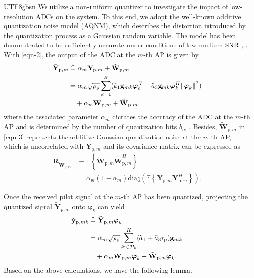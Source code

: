 \documentclass[lettersize,journal]{IEEEtran}
\begin{document}
\begin{CJK}{UTF8}{gbsn}
We utilize a non-uniform quantizer to investigate the impact of low-resolution ADCs on the system. To this end, we adopt the well-known additive quantization noise model (AQNM), which describes the distortion introduced by the quantization process as a Gaussian random variable. The model has been demonstrated to be sufficiently accurate under conditions of low-medium-SNR \cite{paper7}, \cite{paper8}. With \eqref{eqn-2}, the output of the ADC at the $m$-th AP is given by
\begin{align}\label{eqn-3}{\tilde {\bf{Y}}_{\text{p},m}} & \triangleq {\alpha _m}{\mathbf{Y}_{\text{p},m}} + {\tilde {\bf{W}}_{\text{p},m}} \nonumber\\
&= {\alpha _m}\sqrt {{\rho _\text{p}}} \sum_{k=1}^{K}  ({\tilde{a} _1}{{\bf{g}}_{mk}}\boldsymbol{\varphi} _k^H + {\tilde{a}_3}{{\bf{g}}_{mk}}\boldsymbol{\varphi} _k^H{\left\| {\boldsymbol{\varphi}_k} \right\|^2}) \nonumber \\
&\quad+ {\alpha _m}{\mathbf{W}_{\text{p},m}} + {\tilde{\bf{W}}_{\text{p},m}},\end{align}
where the associated parameter ${\alpha_m}$ dictates the accuracy of the ADC at the $m$-th AP and is determined by the number of quantization bits $b_m$ \cite{paper9}. Besides, ${\tilde{\mathbf{W}}_ {\text{p}, m}}$ in \eqref{eqn-3} represents the additive Gaussian quantization noise at the $m$-th AP, which is uncorrelated with $\mathbf{Y}_{\text{p},m}$ and its covariance matrix can be expressed as
\begin{align}\label{eqn-4}
\mathbf{R}_{\tilde{ \mathbf{W}}_{\text{p},m}} &= \mathbb{E}\left\{ {{\tilde{\mathbf{W}}_{\text{p},m}}\tilde {\mathbf{W}}_{\text{p},m}^H} \right\} \nonumber\\ 
&= {\alpha _m}(1 - {\alpha _m})\text{diag}\left(\mathbb{E}\left\{ {{\mathbf{Y}_{\text{p},m}}\mathbf{Y}_{\text{p},m}^H} \right\} \right). 
\end{align}

Once the received pilot signal at the $m$-th AP has been quantized, projecting the quantized signal $\tilde {\mathbf{Y}}_{\text{p},m}$ onto $\boldsymbol{\varphi}_k$ can yield
\begin{align}\label{eqn-5}
\check{\mathbf{y} }_{\text{p},mk}&\triangleq {\tilde{\mathbf{Y}}_{\text{p},m}}\boldsymbol{\varphi }_k \nonumber\\
&= {\alpha _m}\sqrt {{\rho _\text{p}}}\sum_{k'\in \mathcal{P}_k }^{K}  ({\tilde{a}_1} + {\tilde{a}_3}\tau_\text{p}){{\bf{g}}_{mk}}\nonumber \\
&\quad + {\alpha _m}{\mathbf{W}_{\text{p},m}}\boldsymbol{\varphi}_k + {{\tilde{\mathbf{W}}}_{\text{p},m}}\boldsymbol{\varphi}_k.
\end{align}
Based on the above calculations, we have the following lemma.


\end{CJK}
\end{document}
